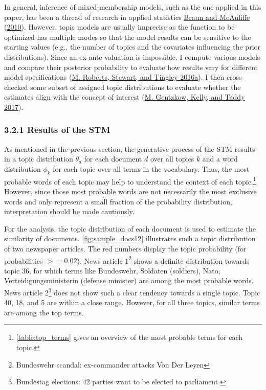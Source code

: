\documentclass[
  12pt,
]{article}
\begin{document}
In general, inference of mixed-membership models, such as the one
applied in this paper, has been a thread of research in applied
statistics \protect\hyperlink{ref-braun_variational_2010}{Braun and
McAuliffe} (\protect\hyperlink{ref-braun_variational_2010}{2010}).
However, topic models are usually imprecise as the function to be
optimized has multiple modes so that the model results can be sensitive
to the starting values (e.g., the number of topics and the covariates
influencing the prior distributions). Since an ex-ante valuation is
impossible, I compute various models and compare their posterior
probability to evaluate how results vary for different model
specifications (\protect\hyperlink{ref-roberts_navigating_2016}{M.
Roberts, Stewart, and Tingley 2016a}). I then cross-checked some subset
of assigned topic distributions to evaluate whether the estimates align
with the concept of interest
(\protect\hyperlink{ref-gentzkow_text_2017}{M. Gentzkow, Kelly, and
Taddy 2017}).

\hypertarget{results-of-the-stm}{%
\subsubsection{3.2.1 Results of the STM}\label{results-of-the-stm}}

As mentioned in the previous section, the generative process of the STM
results in a topic distribution \(\theta_d\) for each document \(d\)
over all topics \(k\) and a word distribution \(\phi_k\) for each topic
over all terms in the vocabulary. Thus, the most probable words of each
topic may help to understand the context of each topic.\footnote{\autoref{table:top_terms}
  gives an overview of the most probable terms for each topic.} However,
since those most probable words are not necessarily the most exclusive
words and only represent a small fraction of the probability
distribution, interpretation should be made cautiously.

For the analysis, the topic distribution of each document is used to
estimate the similarity of documents. \autoref{fig:sample_docs12}
illustrates such a topic distribution of two newspaper articles. The red
numbers display the topic probability (for probabilities \(>= 0.02\)).
News article 1\footnote{Bundeswehr scandal: ex-commander attacks Von Der
  Leyen} shows a definite distribution towards topic 36, for which terms
like Bundeswehr, Soldaten (soldiers), Nato, Verteidigungsministerin
(defense minister) are among the most probable words. News article
2\footnote{Bundestag elections: 42 parties want to be elected to
  parliament.} does not show such a clear tendency towards a single
topic. Topic 40, 18, and 5 are within a close range. However, for all
three topics, similar terms are among the top terms.
\end{document}
